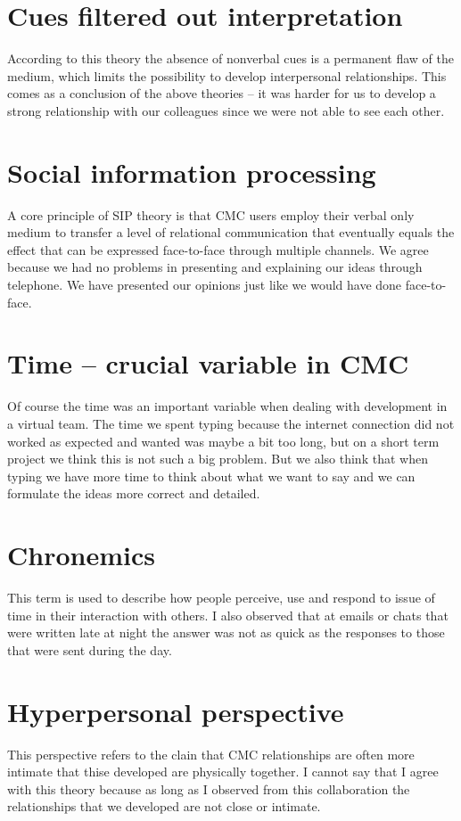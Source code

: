 \section{Cues filtered out interpretation}
According to this theory the absence of nonverbal cues is a permanent flaw of the medium, which limits the possibility to develop interpersonal relationships. This comes as a conclusion of the above theories – it was harder for us to develop a strong relationship with our colleagues since we were not able to see each other.

\section{Social information processing}
A core principle of SIP theory is that CMC users employ their verbal only medium to transfer a level of relational communication that eventually equals the effect that can be expressed face-to-face through multiple channels. We agree because we had no problems in presenting and explaining our ideas through telephone. We have presented our opinions just like we would have done face-to-face.

\section{Time – crucial variable in CMC}
Of course the time was an important variable when dealing with development in a virtual team. The time we spent typing because the internet connection did not worked as expected and wanted was maybe a bit too long, but on a short term project we think this is not such a big problem. But we also think that when typing we have more time to think about what we want to say and we can formulate the ideas more correct and detailed.

\section{Chronemics}
This term is used to describe how people perceive, use and respond to issue of time in their interaction with others. I also observed that at emails or chats that were written late at night the answer was not as quick as the responses to those that were sent during the day.

\section{Hyperpersonal perspective}
This perspective refers to the clain that CMC relationships are often more intimate that thise developed are physically together. I cannot say that I agree with this theory because as long as I observed from this collaboration the relationships that we developed are not close or intimate.

